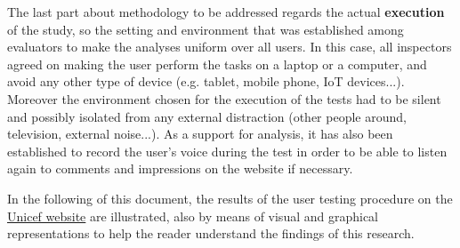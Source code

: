 The last part about methodology to be addressed regards the actual \textbf{execution} of the study, so the setting and environment that was established among evaluators to make the analyses uniform over all users.
In this case, all inspectors agreed on making the user perform the tasks on a laptop or a computer, and avoid any other type of device (e.g. tablet, mobile phone, IoT devices...). Moreover the environment chosen for the execution of the tests had to be silent and possibly isolated from any external distraction (other people around, television, external noise...).
As a support for analysis, it has also been established to record the user's voice during the test in order to be able to listen again to comments and impressions on the website if necessary.

In the following of this document, the results of the user testing procedure on the \href{https://www.unicef.org/}{Unicef website} are illustrated, also by means of visual and graphical representations to help the reader understand the findings of this research.
	

